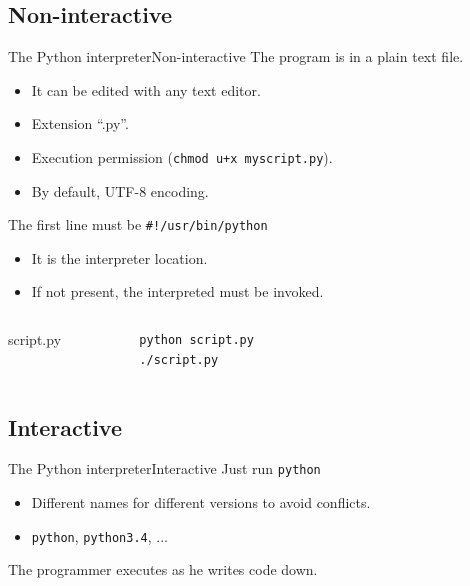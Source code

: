 \documentclass[10pt,compress]{beamer} %
\begin{document}
\subsection{Non-interactive}
\begin{frame}[fragile]{The Python interpreter}{Non-interactive}
	The program is in a plain text file.
		\begin{itemize}
		\item It can be edited with any text editor.
		\item Extension ``.py''.
		\item Execution permission (\texttt{chmod u+x myscript.py}).
		\item By default, UTF-8 encoding.
		\end{itemize}
	The first line must be \texttt{\#!/usr/bin/python}
		\begin{itemize}
		\item It is the interpreter location.
		\item If not present, the interpreted must be invoked.
		\end{itemize}

    \begin{columns}
	
		\vspace{-0.2cm}
		\begin{block}{script.py}
		\vspace{-0.2cm}
			
		\end{block}

    	\begin{block}{}
		\begin{verbatim}
		python script.py
		./script.py
		\end{verbatim}
		\end{block}
	\end{columns}
\end{frame}

\subsection{Interactive}
\begin{frame}{The Python interpreter}{Interactive}
		Just run \texttt{python}
			\begin{itemize}
				\item Different names for different versions to avoid conflicts.
				\item \texttt{python}, \texttt{python3.4}, ...
			\end{itemize}

		\vspace{-0.2cm}
		\begin{block}{}
		\vspace{-0.2cm}
			
		\end{block}
		The programmer executes as he writes code down.
\end{frame}
\end{document}
